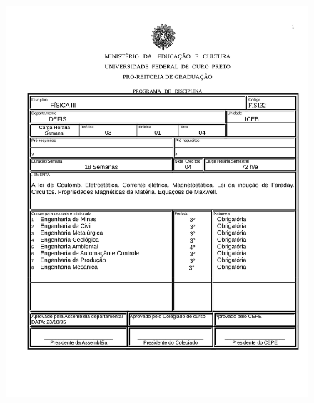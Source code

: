 \begin{figure}[p]
	\centering 
	\includegraphics[scale=0.7]{capitulos/anexo1-programas-disciplina/p33.pdf}
\end{figure}

